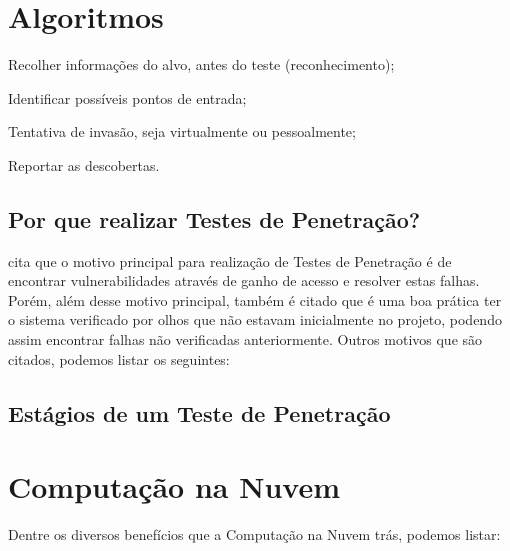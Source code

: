 \section{Algoritmos}
\label{s.algoritmos }



\begin{alineas}
  \item Recolher informações do alvo, antes do teste (reconhecimento);
  \item Identificar possíveis pontos de entrada;
  \item Tentativa de invasão, seja virtualmente ou pessoalmente;
  \item Reportar as descobertas.
\end{alineas}



\subsection{Por que realizar Testes de Penetração?}
\label{ss.whypentest}



 cita que o motivo principal para realização de Testes de Penetração é de encontrar vulnerabilidades através de ganho de acesso e resolver estas falhas. Porém, além desse motivo principal, também é citado que é uma boa prática ter o sistema verificado por olhos que não estavam inicialmente no projeto, podendo assim encontrar falhas não verificadas anteriormente. Outros motivos que são citados, podemos listar os seguintes:

\subsection{Estágios de um Teste de Penetração}
\label{ss.stagespentest}



\section{Computação na Nuvem}
\label{s.cloudcomputing}

Dentre os diversos benefícios que a Computação na Nuvem trás, podemos listar:


